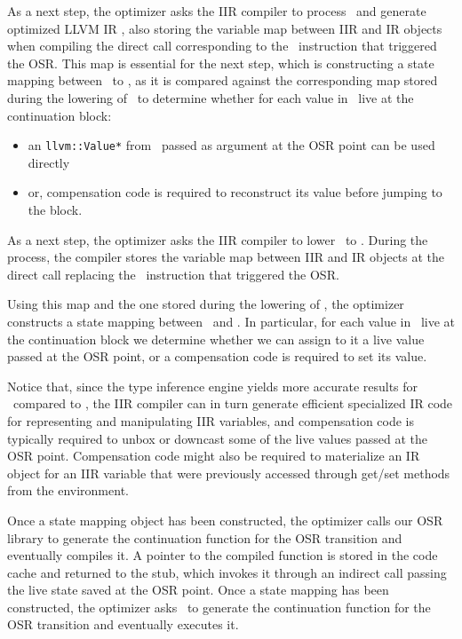 \begin{enumerate}[noitemsep]
\begin{enumerate}
\ifdefined \fullver
As a next step, the optimizer asks the IIR compiler to process \fOptIIR\ and generate optimized LLVM IR \fOptIR, also storing the variable map between IIR and IR objects when compiling the direct call corresponding to the \feval\ instruction that triggered the OSR.
This map is essential for the next step, which is constructing a state mapping between \fIR\ to \fOptIR, as it is compared against the corresponding map stored during the lowering of \fIIR\ to determine whether for each value in \fOptIR\ live at the continuation block:
\begin{itemize}[noitemsep, partopsep=0.5ex, topsep=0.5ex]
\item an {\tt llvm::Value*} from \fIR\ passed as argument at the OSR point can be used directly
\item or, compensation code is required to reconstruct its value before jumping to the block.
\end{itemize}
\else
As a next step, the optimizer asks the IIR compiler to lower \fOptIIR\ to \fOptIR. During the process, the compiler stores the variable map between IIR and IR objects at the direct call replacing the \feval\ instruction that triggered the OSR.

Using this map and the one stored during the lowering of \fIIR, the optimizer constructs a state mapping between \fIR\ and \fOptIR. In particular, for each value in \fOptIR\ live at the continuation block we determine whether we can assign to it a live value passed at the OSR point, or a compensation code is required to set its value.

Notice that, since the type inference engine yields more accurate results for \fOptIIR\ compared to \fIIR, the IIR compiler can in turn generate efficient specialized IR code for representing and manipulating IIR variables, and compensation code is typically required to unbox or downcast some of the live values passed at the OSR point.
\ifdefined \fullver
Compensation code might also be required to materialize an IR object for an IIR variable that were previously accessed through get/set methods from the environment. %
\fi

\ifdefined \fullver
Once a state mapping object has been constructed, the optimizer calls our OSR library to generate the continuation function for the OSR transition and eventually compiles it.
A pointer to the compiled function is stored in the code cache and returned to the stub, which invokes it through an indirect call passing the live state saved at the OSR point.
\else
\noindent Once a state mapping has been constructed, the optimizer asks \osrkit\ to generate the continuation function for the OSR transition and eventually executes it.
\fi


\end{enumerate}
\end{enumerate}
